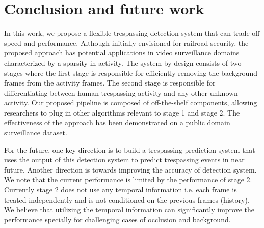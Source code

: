 \section{Conclusion and future work}
In this work, we propose a flexible trespassing detection system that can trade off speed and performance. Although initially envisioned for railroad security, the proposed approach has potential applications in video surveillance domains characterized by a sparsity in activity.  The system by design consists of two stages where the first stage is responsible for efficiently removing the background frames from the activity frames. The second stage is responsible for differentiating between human trespassing activity and any other unknown activity. Our proposed pipeline is composed of off-the-shelf components, allowing researchers to plug in other algorithms relevant to stage 1 and stage 2. The effectiveness of the approach has been demonstrated on a public domain surveillance dataset. 

For the future, one key direction is to build a trespassing prediction system that uses the output of this detection system to predict trespassing events in near future. Another direction is towards improving the accuracy of detection system. We note that the current performance is limited by the performance of stage 2. Currently stage 2 does not use any temporal information i.e. each frame is treated independently and is not conditioned on the previous frames (history). We believe that utilizing the temporal information can significantly improve the performance specially for challenging cases of occlusion and background.